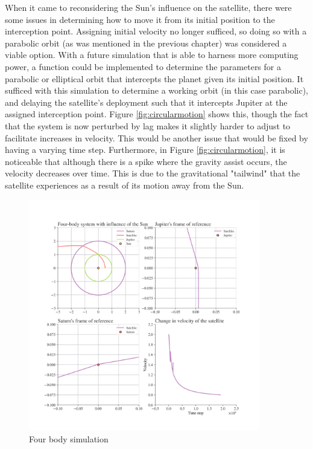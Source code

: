 \documentclass[11pt, english]{report}
\begin{document}
{When it came to reconsidering the Sun's influence on the satellite, there were some issues in determining how to move it from its initial position to the interception point. Assigning initial velocity no longer sufficed, so doing so with a parabolic orbit (as was mentioned in the previous chapter) was considered a viable option. With a future simulation that is able to harness more computing power, a function could be implemented to determine the parameters for a parabolic or elliptical orbit that intercepts the planet given its initial position. It sufficed with this simulation to determine a working orbit (in this case parabolic), and delaying the satellite's deployment such that it intercepts Jupiter at the assigned interception point. Figure \ref{fig:circularmotion} shows this, though the fact that the system is now perturbed by lag makes it slightly harder to adjust to facilitate increases in velocity. This would be another issue that would be fixed by having a varying time step. Furthermore, in Figure \ref{fig:circularmotion}, it is noticeable that although there is a spike where the gravity assist occurs, the velocity decreases over time. This is due to the gravitational "tailwind" that the satellite experiences as a result of its motion away from the Sun.

\begin{figure}[ht]
    \centering
    \includegraphics[width=0.9\textwidth]{graphics/fourbody.png}
    \caption{Four body simulation}
    \label{fig:fourbody}
\end{figure}

}
\end{document}
